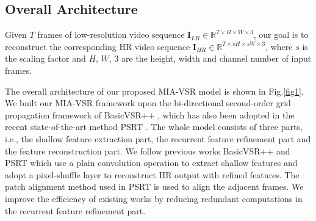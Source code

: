 \documentclass[10pt,twocolumn,letterpaper]{article}
\begin{document}
\subsection{Overall Architecture}
Given $T$ frames of low-resolution video sequence $\bm{I}_{LR} \in  \mathbb{R}^{T \times H \times W \times 3}$, our goal is to reconstruct the corresponding HR video sequence
$\bm{I}_{HR}\in \mathbb{R}^{T \times sH \times sW \times 3}$, where $s$ is the scaling factor and $H$, $W$, $3$ are the height, width and channel number of input frames.
%

The overall architecture of our proposed MIA-VSR model is shown in Fig.\ref{fig1}. We built our MIA-VSR framework upon the bi-directional second-order grid propagation framework of BasicVSR++ \cite{chan2022basicvsr++}, which has also been adopted in the recent state-of-the-art method PSRT \cite{shi2022rethinking}.
%
The whole model consists of three parts, i.e., the shallow feature extraction part, the recurrent feature refinement part and the feature reconstruction part.
%
We follow previous works BasicVSR++ \cite{chan2022basicvsr++} and PSRT \cite{shi2022rethinking} which use a plain convolution operation to extract shallow features and adopt a pixel-shuffle layer \cite{shi2016real} to reconstruct HR output with refined features.
%
The patch alignment method used in PSRT \cite{shi2016real} 
is used to align the adjacent frames.
%
We improve the efficiency of existing works by reducing redundant computations in the recurrent feature refinement part.
%
\end{document}

